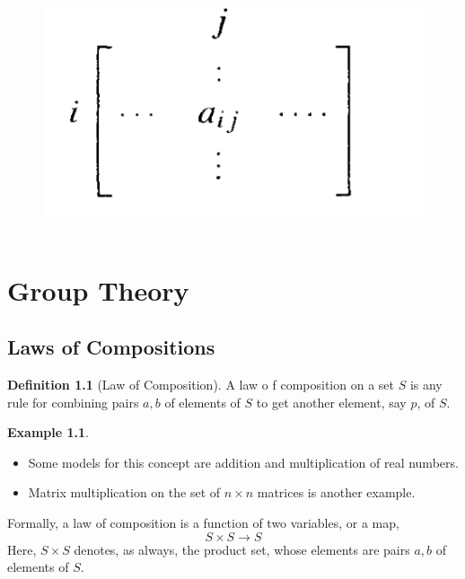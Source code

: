 \documentclass[
]{book}
\providecommand{\tightlist}{%
  \setlength{\itemsep}{0pt}\setlength{\parskip}{0pt}}
\theoremstyle{definition}
\newtheorem{definition}{Definition}[chapter]
\theoremstyle{definition}
\newtheorem{example}{Example}[chapter]
\theoremstyle{definition}
\theoremstyle{definition}
\theoremstyle{remark}
\begin{document}
\begin{figure}
\centering
\includegraphics{figures/ch_1/fig02.png}
\caption{\label{fig:fig02}\(~\)}
\end{figure}

\hypertarget{group-theory}{%
\chapter{Group Theory}\label{group-theory}}

\hypertarget{laws-of-compositions}{%
\section{Laws of Compositions}\label{laws-of-compositions}}

\begin{definition}[Law of Composition]
\protect\hypertarget{def:unnamed-chunk-2}{}\label{def:unnamed-chunk-2}A law o f composition on a set \(S\) is any rule for combining pairs \(a, b\) of elements of \(S\) to get another element, say \(p\), of \(S\).
\end{definition}

\begin{example}
\protect\hypertarget{exm:unnamed-chunk-3}{}\label{exm:unnamed-chunk-3}\leavevmode

\begin{itemize}
\tightlist
\item
  Some models for this concept are addition and multiplication
  of real numbers.
\item
  Matrix multiplication on the set of \(n \times n\) matrices is another example.
\end{itemize}

\end{example}

Formally, a law of composition is a function of two variables, or a map,
\[S\times S \to S\]
Here, \(S \times S\) denotes, as always, the product set, whose elements are pairs \(a, b\) of elements of \(S\).
\end{document}
